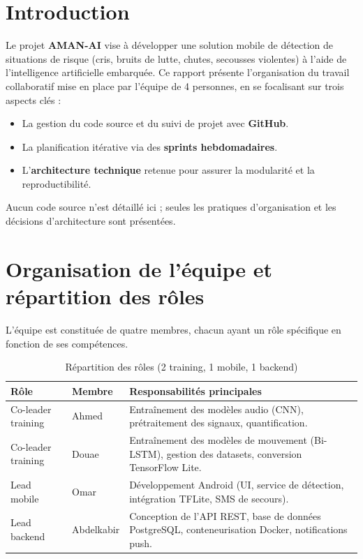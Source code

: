 \documentclass[11pt,a4paper]{article}
\begin{document}
\tableofcontents
\listoffigures
\listoftables
\newpage

\section{Introduction}
Le projet \textbf{AMAN-AI} vise à développer une solution mobile de détection de situations de risque (cris, bruits de lutte, chutes, secousses violentes) à l’aide de l’intelligence artificielle embarquée. Ce rapport présente l’organisation du travail collaboratif mise en place par l’équipe de 4 personnes, en se focalisant sur trois aspects clés :
\begin{itemize}
    \item La gestion du code source et du suivi de projet avec \textbf{GitHub}.
    \item La planification itérative via des \textbf{sprints hebdomadaires}.
    \item L’\textbf{architecture technique} retenue pour assurer la modularité et la reproductibilité.
\end{itemize}
Aucun code source n’est détaillé ici ; seules les pratiques d’organisation et les décisions d’architecture sont présentées.

\section{Organisation de l’équipe et répartition des rôles}
L’équipe est constituée de quatre membres, chacun ayant un rôle spécifique en fonction de ses compétences.

\begin{table}[H]
\centering
\begin{tabular}{p{5cm}  p{3cm} p{7cm}}
\toprule
\textbf{Rôle} & \textbf{Membre} & \textbf{Responsabilités principales} \\
\midrule
Co-leader training & Ahmed & Entraînement des modèles audio (CNN), prétraitement des signaux, quantification. \\
Co-leader training & Douae & Entraînement des modèles de mouvement (Bi-LSTM), gestion des datasets, conversion TensorFlow Lite. \\
Lead mobile & Omar & Développement Android (UI, service de détection, intégration TFLite, SMS de secours). \\
Lead backend & Abdelkabir & Conception de l’API REST, base de données PostgreSQL, conteneurisation Docker, notifications push. \\
\bottomrule
\end{tabular}
\caption{Répartition des rôles (2 training, 1 mobile, 1 backend)}
\end{table}
\end{document}
